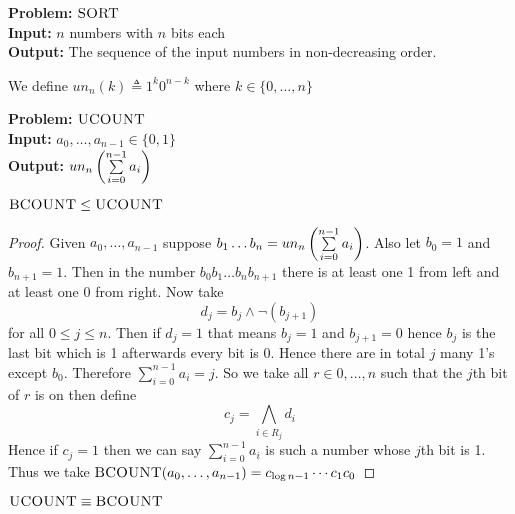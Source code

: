 \parinf

\textbf{Problem:} $\textsc{SORT}$\\
\textbf{Input:} $n$ numbers with $n$ bits each\\
\textbf{Output:} The sequence of the input numbers in non-decreasing order.
\begin{definition}
	We define $un_n(k)\triangleq 1^k0^{n-k}$ where $k\in\{0,\dots,n\}$
\end{definition}
\parinf
\textbf{Problem:} $\textsc{UCOUNT}$\\
\textbf{Input:} $a_0,\dots,a_{n-1}\in \{0,1\}$\\[2mm]
\textbf{Output:} $un_n\left(\sum\limits_{i=0}^{n-1}a_i \right)$\parinn
\begin{lemma}
	$\textsc{BCOUNT}\leq \textsc{UCOUNT}$
\end{lemma}
\begin{proof}
	Given $a_0,\dots, a_{n-1}$ suppose $b_1\dots b_n=un_n\left( \sum\limits_{i=0}^{n-1}a_i\right)$. Also let $b_0=1$ and $b_{n+1}=1$. Then in the number $b_0b_1\dots b_nb_{n+1}$ there is at least one 1 from left and at least one 0 from right. Now take $$d_j=b_j\wedge \neg(b_{j+1})$$ for all $0\leq j\leq n$. Then if $d_j=1$ that means $b_j=1$ and $b_{j+1}=0$ hence $b_j$ is the last bit which is 1 afterwards every bit is 0. Hence there are in total $j$ many 1's except $b_0$. Therefore $\sum\limits_{i=0}^{n-1}a_i=j$. So we take all $r\in {0,\dots, n}$ such that the $j$th bit of $r$ is on then define $$c_j=\bigwedge_{i\in R_j}d_i$$Hence if $c_j=1$ then we can say $\sum\limits_{i=0}^{n-1}a_i$ is such a number whose $j$th bit is 1. Thus we take $\textsc{BCOUNT}(a_0,\dots, a_{n-1})=c_{\log n-1}\cdots c_1c_0$
\end{proof}

\begin{theorem}
	$\textsc{UCOUNT}\equiv \textsc{BCOUNT}$
\end{theorem}

